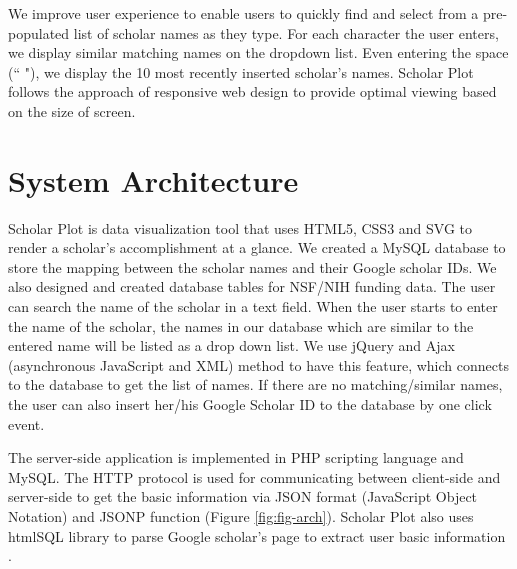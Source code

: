 
We improve user experience to enable users to quickly find and select from a pre-populated list of scholar names as they type. For each character the user enters, we display similar matching names on the dropdown list. Even entering the space (`` "), we display the 10 most recently inserted scholar's names. Scholar Plot follows the approach of responsive web design to provide optimal viewing based on the size of screen.


\section{System Architecture}
Scholar Plot is data visualization tool that uses HTML5, CSS3 and SVG to render a scholar's accomplishment at a glance. We created a MySQL database to store the mapping between the scholar names and their Google scholar IDs. We also designed and created database tables for NSF/NIH funding data. The user can search the name of the scholar in a text field. When the user starts to enter the name of the scholar, the names in our database which are similar to the entered name will be listed as a drop down list. We use jQuery and Ajax (asynchronous JavaScript and XML) method to have this feature, which connects to the database to get the list of names. If there are no matching/similar names, the user can also insert her/his Google Scholar ID to the database by one click event.

The server-side application is implemented in PHP scripting language and MySQL. The HTTP protocol is used for communicating between client-side and server-side to get the basic information via JSON format (JavaScript Object Notation) and JSONP function (Figure \ref{fig:fig-arch}). Scholar Plot also uses htmlSQL library to parse Google scholar's page to extract user basic information \cite{htmlSQL}.

